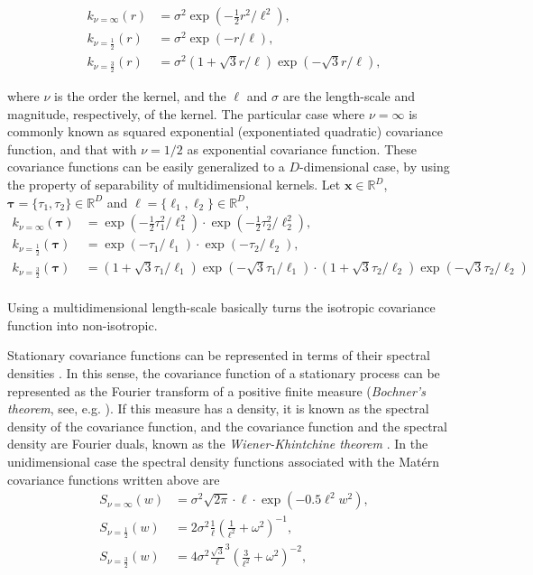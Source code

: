 \documentclass[]{interact}
\theoremstyle{plain}%
\theoremstyle{definition}
\theoremstyle{remark}
\begin{document}
%
\begin{align*}
k_{\nu=\infty}(r)&=\sigma^2 \exp(-\frac{1}{2} r^2/\ell^2), \\
k_{\nu=\frac{1}{2}}(r)&=\sigma^2 \exp(-r/\ell),  \\
k_{\nu=\frac{3}{2}}(r)&=\sigma^2(1+\sqrt{3}r/\ell) \exp(-\sqrt{3}r/\ell), 
\end{align*}

\noindent where $\nu$ is the order the kernel, and the $\ell$ and $\sigma$ are the length-scale and magnitude, respectively, of the kernel. The particular case where $\nu=\infty$ is commonly known as squared exponential (exponentiated quadratic) covariance function, and that with $\nu=1/2$ as exponential covariance function. These covariance functions can be easily generalized to a $D$-dimensional case, by using the property of separability of multidimensional kernels. Let $\mathbf{x}\in \mathbb{R}^D$, $\mathbf{\bm{\tau}}=\{\tau_1,\tau_2\}\in \mathbb{R}^D$ and $\boldsymbol{\ell}=\{\ell_1,\ell_2\}\in \mathbb{R}^D$,
%
\begin{align*}
k_{\nu=\infty}(\bm{\tau})&=\exp(-\frac{1}{2} \tau_1^2/\ell_1^2) \cdot \exp(-\frac{1}{2} \tau_2^2/\ell_2^2), \\
k_{\nu=\frac{1}{2}}(\bm{\tau})&=\exp(-\tau_1/\ell_1) \cdot \exp(-\tau_2/\ell_2), \\
k_{\nu=\frac{3}{2}}(\bm{\tau})&=(1+\sqrt{3}\tau_1/\ell_1) \exp(-\sqrt{3}\tau_1/\ell_1) \cdot (1+\sqrt{3}\tau_2/\ell_2) \exp(-\sqrt{3}\tau_2/\ell_2) \\
\end{align*}

\noindent Using a multidimensional length-scale basically turns the isotropic covariance function into non-isotropic. 

Stationary covariance functions can be represented in terms of their spectral densities \citep{rasmussen2006gaussian}. In this sense, the covariance function of a stationary process can be represented as the Fourier transform of a positive finite measure (\textit{Bochner's theorem}, see, e.g. \cite{akhiezer1993theory}). If this measure has a density, it is known as the spectral density of the covariance function, and the covariance function and the spectral density are Fourier duals, known as the \textit{Wiener-Khintchine theorem} \citep{rasmussen2006gaussian}. In the unidimensional case the spectral density functions associated with the Mat\'ern covariance functions written above are
%
\begin{align}\label{eq:specdens}
S_{\nu=\infty}(w)&= \sigma^2 \sqrt{2\pi} \cdot \ell \cdot \exp\left(-0.5 \ell^2 w^2\right), \\
S_{\nu=\frac{1}{2}}(w)&= 2\sigma^2 \frac{1}{\ell}\left(\frac{1}{\ell^2} + \omega^2\right)^{-1}, \\
S_{\nu=\frac{3}{2}}(w)&= 4\sigma^2 \frac{\sqrt{3}}{\ell}^{3}\left(\frac{3}{\ell^2} + \omega^2\right)^{-2}, \\
\end{align}
\end{document}
